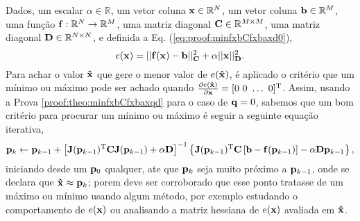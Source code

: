 \begin{myproofT}\label{proof:theo:minfxbCfxbaxd}
Dados,
um escalar $\alpha\in \mathbb{R}$,
um vetor coluna $\VECTOR{x}\in \mathbb{R}^N$, 
um vetor coluna $\VECTOR{b}\in \mathbb{R}^M$,  
uma função $\VECTOR{f}:\mathbb{R}^{N} \rightarrow \mathbb{R}^{M}$, 
uma matriz diagonal $\MATRIX{C} \in \mathbb{R}^{M\times M}$,
uma matriz diagonal $\MATRIX{D} \in \mathbb{R}^{N\times N}$, e 
definida a Eq. (\ref{eq:proof:minfxbCfxbaxd0}),
\begin{equation}\label{eq:proof:minfxbCfxbaxd0}
e(\VECTOR{x})=||\VECTOR{f}(\VECTOR{x})-\VECTOR{b}||_{\MATRIX{C}}^2+\alpha||\VECTOR{x}||_{\MATRIX{D}}^2.
\end{equation}
Para achar o valor  $\VECTOR{\hat{x}}$ que gere o menor valor de $e(\VECTOR{\hat{x}})$, é aplicado
o critério que um mínimo ou máximo pode ser achado quando 
$\frac{\partial e(\VECTOR{\hat{x}})}{\partial \VECTOR{x} }=[0~ 0~ \hdots~ 0 ]^{\transpose}$.
Assim, usando a Prova \ref{proof:theo:minfxbCfxbaxqd} para o caso de $\VECTOR{q}=0$, sabemos que 
um bom critério para procurar um mínimo ou máximo é seguir a seguinte 
equação iterativa,
\begin{equation}\label{eq:proof:minfxbCfxbaxd3}
 \VECTOR{p}_{k} \leftarrow \VECTOR{p}_{k-1} +
\left[ \MATRIX{J}(\VECTOR{p}_{k-1})^{\transpose}\MATRIX{C} \MATRIX{J}(\VECTOR{p}_{k-1})+\alpha \MATRIX{D} \right]^{-1}
\left\{ \MATRIX{J}(\VECTOR{p}_{k-1})^{\transpose}\MATRIX{C} \left[\VECTOR{b}-\VECTOR{f}(\VECTOR{p}_{k-1})\right]-\alpha\MATRIX{D}\VECTOR{p}_{k-1}\right\},
\end{equation}
iniciando desde um $\VECTOR{p}_{0}$ qualquer, ate que $\VECTOR{p}_{k}$ seja muito próximo a $\VECTOR{p}_{k-1}$,
onde se declara que $\VECTOR{\hat{x}} \approx \VECTOR{p}_{k}$; porem deve ser corroborado
que esse ponto tratasse de um máximo ou mínimo usando algum método, por exemplo estudando o comportamento 
de $e(\VECTOR{x})$ ou analisando a matriz hessiana de $e(\VECTOR{x})$ avaliada em $\VECTOR{\hat{x}}$.
\end{myproofT}


